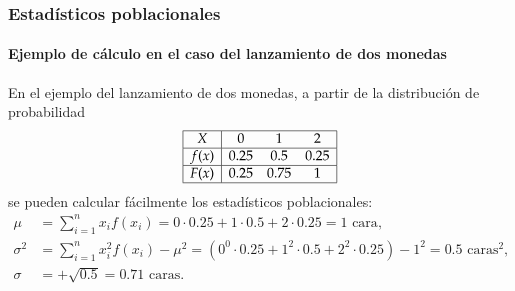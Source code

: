 \begin{frame}
\frametitle{Estadísticos poblacionales}
\framesubtitle{Ejemplo de cálculo en el caso del lanzamiento de dos monedas}
En el ejemplo del lanzamiento de dos monedas, a partir de la distribución de probabilidad
\[
\begin{array}{|c|ccc|}
\hline
X & 0 & 1 & 2\\ \hline
f(x) & 0.25 & 0.5 & 0.25\\
\hline
F(x) & 0.25 & 0.75 & 1 \\
\hline 
\end{array}
\]
se pueden calcular fácilmente los estadísticos poblacionales:
\begin{align*}
\mu &= \sum_{i=1}^n x_i f(x_i) = 0\cdot 0.25 + 1\cdot 0.5 + 2\cdot 0.25 = 1 \mbox{ cara},\\
\sigma^2 &= \sum_{i=1}^n x_i^2 f(x_i) -\mu^2 = (0^0\cdot 0.25 + 1^2\cdot 0.5 + 2^2\cdot 0.25) - 1^2 = 0.5 \mbox{ caras}^2,\\
\sigma &= +\sqrt{0.5} = 0.71 \mbox{ caras}.
\end{align*} 

\end{frame}


